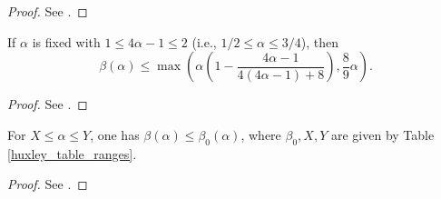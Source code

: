 \literature
{}

\begin{proof}
See \cite[Equation~(3.18)]{bourgain_decoupling_2017}.
\end{proof}

\begin{theorem}\label{beta-hb-2020}  If $\alpha$ is fixed with $1 \leq 4\alpha-1 \leq 2$ (i.e., $1/2 \leq \alpha \leq 3/4$), then
$$ \beta(\alpha) \leq \max\left( \alpha\left(1 - \frac{4\alpha-1}{4(4\alpha-1)+8}\right), \frac{8}{9} \alpha\right).$$
\end{theorem}

\literature
{}

\begin{proof}
See \cite[Theorem 11.2]{demeter_small_2020}.
\end{proof}

\begin{theorem}\label{combined-bound}  For $X \leq \alpha \leq Y$, one has $\beta(\alpha) \leq \beta_0(\alpha)$, where $\beta_0, X, Y$ are given by Table \ref{huxley_table_ranges}.
\end{theorem}

\begin{proof} See \cite[Table 3]{trudgian-yang}.
\end{proof}

